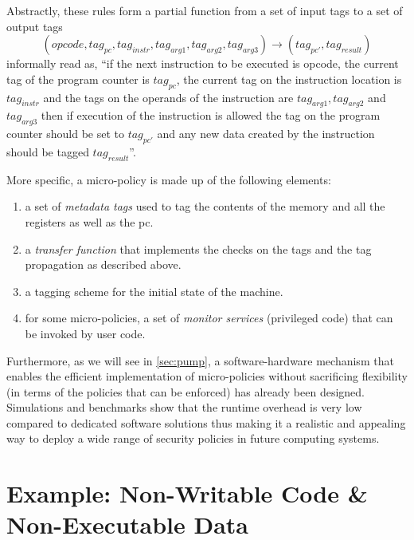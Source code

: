 Abstractly, these rules form a partial function from a set of
input tags to a set of output tags
$$(opcode, tag_{pc},tag_{instr}, tag_{arg1}, tag_{arg2}, tag_{arg3})
\rightarrow (tag_{pc'},tag_{result})$$
informally read as, ``if the next instruction to be executed is opcode, the
current tag of the program counter is $tag_{pc}$, the current tag on the
instruction location is $tag_{instr}$ and the tags on the operands of the
instruction are $tag_{arg1}, tag_{arg2}$ and $tag_{arg3}$ then if execution of
the instruction is allowed the tag on the program counter should be set
to $tag_{pc'}$ and any new data created by the instruction should be tagged
$tag_{result}$''.

More specific, a micro-policy is made up of the following elements:
\begin{enumerate}
\item a set of {\em metadata tags} used to tag the contents of the memory and
all the registers as well as the pc.
\item a {\em transfer function} that implements the checks on the tags and
the tag propagation as described above.
\item a tagging scheme for the initial state of the machine.
\item for some micro-policies, a set of {\em monitor services} (\IE privileged
code) that can be invoked by user code.
\end{enumerate}

Furthermore, as we will see in \cref{sec:pump}, a software-hardware
mechanism that enables the efficient implementation of micro-policies
without sacrificing flexibility (in terms of the policies that can be
enforced) has already been designed. Simulations and benchmarks show
that the runtime overhead is very low compared to dedicated software
solutions thus making it a realistic and appealing way to deploy a
wide range of security policies in future computing systems.

\section{Example:
  Non-Writable Code \& Non-Executable Data}
\label{sec:nwc_nxd}

